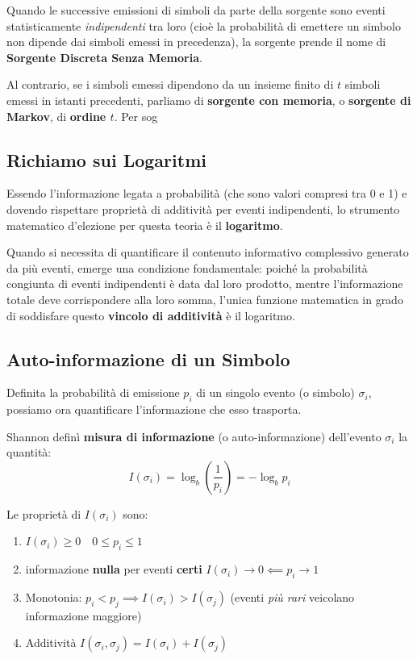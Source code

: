 Quando le successive emissioni di simboli da parte della sorgente sono eventi statisticamente \textit{indipendenti} tra loro (cioè la probabilità di emettere un simbolo non dipende dai simboli emessi in precedenza), la sorgente prende il nome di \textbf{Sorgente Discreta Senza Memoria}.

Al contrario, se i simboli emessi dipendono da un insieme finito di $t$ simboli emessi in istanti precedenti, parliamo di \textbf{sorgente con memoria}, o \textbf{sorgente di Markov}, di \textbf{ordine $t$}. Per sog


\subsection{Richiamo sui Logaritmi}
Essendo l'informazione legata a probabilità (che sono valori compresi tra 0 e 1) e dovendo rispettare proprietà di additività per eventi indipendenti, lo strumento matematico d'elezione per questa teoria è il \textbf{logaritmo}. 

Quando si necessita di quantificare il contenuto informativo complessivo generato da più eventi, emerge una condizione fondamentale: poiché la probabilità congiunta di eventi indipendenti è data dal loro prodotto, mentre l'informazione totale deve corrispondere alla loro somma, l'unica funzione matematica in grado di soddisfare questo \textbf{vincolo di additività} è il logaritmo.

\subsection{Auto-informazione di un Simbolo}
Definita la probabilità di emissione $p_i$ di un singolo evento (o simbolo) $\sigma_i$, possiamo ora quantificare l'informazione che esso trasporta.

Shannon definì \textbf{misura di informazione} (o auto-informazione) dell'evento $\sigma_i$ la quantità:
\[ I(\sigma_i) = \log_b \left( \frac{1}{p_i} \right) = - \log_b p_i \]

Le proprietà di $I(\sigma_i)$ sono:
\begin{enumerate}
    \item $I(\sigma_i) \geq 0 \quad 0 \leq p_i \leq 1$
    \item informazione \textbf{nulla} per eventi \textbf{certi} $I(\sigma_i) \to 0 \impliedby p_i \to 1$ 
    \item Monotonia: $p_i < p_j \implies I(\sigma_i) > I(\sigma_j)$ (eventi \textit{più rari} veicolano informazione maggiore)
    \item Additività $I(\sigma_i,\sigma_j)= I(\sigma_i) + I(\sigma_j)$
\end{enumerate}

